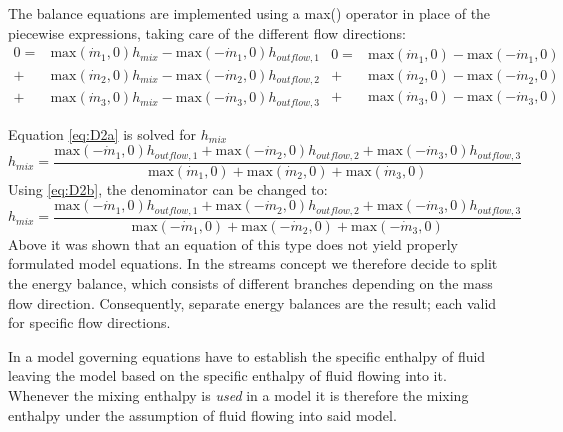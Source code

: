 The balance equations are implemented using a max() operator in place of
the piecewise expressions, taking care of the different flow directions:
\begin{subequations}
\begin{equation}
\begin{split}
0=&\text{max}(\dot{m}_1,0)h_{mix}-\text{max}(-\dot{m}_1,0)h_{outflow,1}\\
+&\text{max}(\dot{m}_2,0)h_{mix}-\text{max}(-\dot{m}_2,0)h_{outflow,2}\\
+&\text{max}(\dot{m}_3,0)h_{mix}-\text{max}(-\dot{m}_3,0)h_{outflow,3}
\end{split}
\label{eq:D2a}
\end{equation}

\begin{equation}
\begin{split}
0=&\text{max}(\dot{m}_1,0)-\text{max}(-\dot{m}_1,0)\\
+&\text{max}(\dot{m}_2,0)-\text{max}(-\dot{m}_2,0)\\
+&\text{max}(\dot{m}_3,0)-\text{max}(-\dot{m}_3,0)
\end{split}
\label{eq:D2b}
\end{equation}
\label{eq:D2}
\end{subequations}

Equation \cref{eq:D2a} is solved for $h_{mix}$
\begin{equation*}
h_{mix}=\frac{\text{max}(-\dot{m}_1,0)h_{outflow,1}+\text{max}(-\dot{m}_2,0)h_{outflow,2}+\text{max}(-\dot{m}_3,0)h_{outflow,3}}
{\text{max}(\dot{m}_1,0)+\text{max}(\dot{m}_2,0)+\text{max}(\dot{m}_3,0)}
\end{equation*}
Using \cref{eq:D2b}, the denominator can be changed to:
\begin{equation*}
h_{mix}=\frac{\text{max}(-\dot{m}_1,0)h_{outflow,1}+\text{max}(-\dot{m}_2,0)h_{outflow,2}+\text{max}(-\dot{m}_3,0)h_{outflow,3}}
{\text{max}(-\dot{m}_1,0)+\text{max}(-\dot{m}_2,0)+\text{max}(-\dot{m}_3,0)}
\end{equation*}
Above it was shown that an equation of this type does not yield properly
formulated model equations. In the streams concept we therefore decide
to split the energy balance, which consists of different branches
depending on the mass flow direction. Consequently, separate energy
balances are the result; each valid for specific flow directions.

In a model governing equations have to establish the specific enthalpy
of fluid leaving the model based on the specific enthalpy of fluid
flowing into it. Whenever the mixing enthalpy is \emph{used} in a model
it is therefore the mixing enthalpy under the assumption of fluid
flowing into said model.

